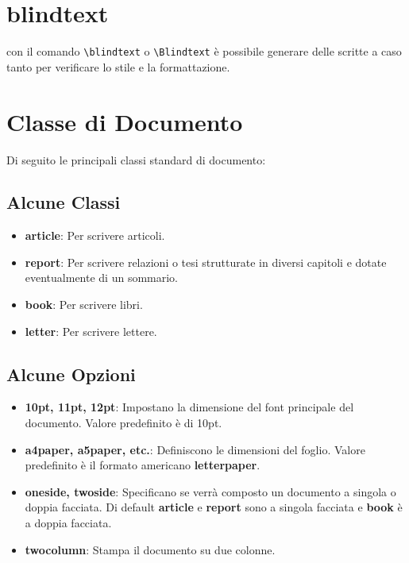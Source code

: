 \documentclass{report}
\begin{document}
        \section{blindtext}
            con il comando \verb!\blindtext! o \verb!\Blindtext! è possibile generare delle scritte a caso tanto per verificare lo stile e la formattazione.

        \section{Classe di Documento}
            Di seguito le principali classi standard di documento:
            \subsection{Alcune Classi}
                \begin{itemize}
                    \item \textbf{article}: Per scrivere articoli.
                    \item \textbf{report}: Per scrivere relazioni o tesi strutturate in diversi capitoli e dotate eventualmente di un sommario.
                    \item \textbf{book}: Per scrivere libri.
                    \item \textbf{letter}: Per scrivere lettere. 
                \end{itemize}

            \subsection{Alcune Opzioni}
                \begin{itemize}
                    \item \textbf{10pt, 11pt, 12pt}: Impostano la dimensione del font principale del documento. Valore predefinito è di 10pt.
                    \item \textbf{a4paper, a5paper, etc.}: Definiscono le dimensioni del foglio. Valore predefinito è il formato americano \textbf{letterpaper}.
                    \item \textbf{oneside, twoside}: Specificano se verrà composto un documento a singola o doppia facciata. Di default \textbf{article} e \textbf{report} sono a singola facciata e \textbf{book} è a doppia facciata.
                    \item \textbf{twocolumn}: Stampa il documento su due colonne.
                \end{itemize}
\end{document}
